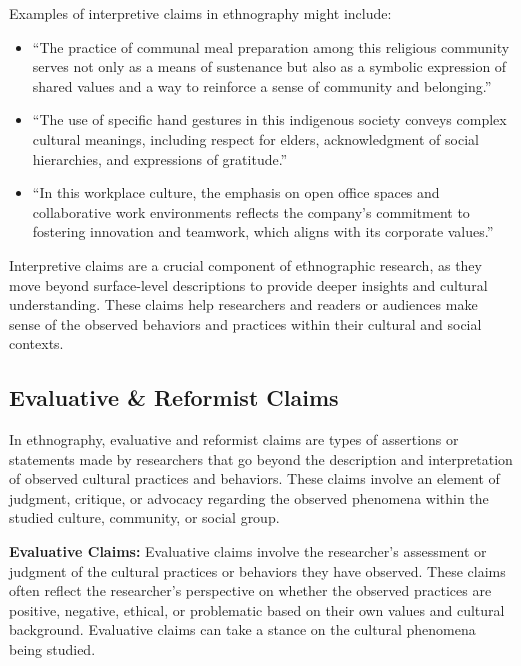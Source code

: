 \documentclass[
  b5paper]{book}
\begin{document}
Examples of interpretive claims in ethnography might include:

\begin{itemize}
\item
  ``The practice of communal meal preparation among this religious community serves not only as a means of sustenance but also as a symbolic expression of shared values and a way to reinforce a sense of community and belonging.''
\item
  ``The use of specific hand gestures in this indigenous society conveys complex cultural meanings, including respect for elders, acknowledgment of social hierarchies, and expressions of gratitude.''
\item
  ``In this workplace culture, the emphasis on open office spaces and collaborative work environments reflects the company's commitment to fostering innovation and teamwork, which aligns with its corporate values.''
\end{itemize}

Interpretive claims are a crucial component of ethnographic research, as they move beyond surface-level descriptions to provide deeper insights and cultural understanding. These claims help researchers and readers or audiences make sense of the observed behaviors and practices within their cultural and social contexts.

\hypertarget{evaluative-reformist-claims}{%
\subsection*{Evaluative \& Reformist Claims}\label{evaluative-reformist-claims}}

In ethnography, evaluative and reformist claims are types of assertions or statements made by researchers that go beyond the description and interpretation of observed cultural practices and behaviors. These claims involve an element of judgment, critique, or advocacy regarding the observed phenomena within the studied culture, community, or social group.

\textbf{Evaluative Claims:} Evaluative claims involve the researcher's assessment or judgment of the cultural practices or behaviors they have observed. These claims often reflect the researcher's perspective on whether the observed practices are positive, negative, ethical, or problematic based on their own values and cultural background. Evaluative claims can take a stance on the cultural phenomena being studied.
\end{document}
